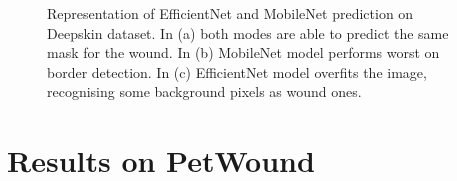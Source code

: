 \documentclass[../main.tex]{subfiles}
\begin{document}
\begin{figure}[H]



\caption{Representation of EfficientNet and MobileNet prediction on  Deepskin dataset. In (a) both modes are able to predict the same mask for the wound. In (b) MobileNet model performs worst on border detection. In (c) EfficientNet model overfits the image, recognising some background pixels as wound ones.}
\label{fig:deep-visual-results}
\end{figure}



\section{Results on PetWound}
\end{document}
